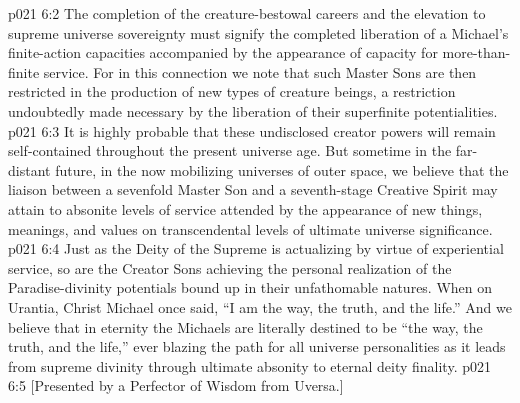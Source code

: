 \vs p021 6:2 The completion of the creature\hyp{}bestowal careers and the elevation to supreme universe sovereignty must signify the completed liberation of a Michael’s finite\hyp{}action capacities accompanied by the appearance of capacity for more\hyp{}than\hyp{}finite service. For in this connection we note that such Master Sons are then restricted in the production of new types of creature beings, a restriction undoubtedly made necessary by the liberation of their superfinite potentialities.
\vs p021 6:3 It is highly probable that these undisclosed creator powers will remain self\hyp{}contained throughout the present universe age. But sometime in the far\hyp{}distant future, in the now mobilizing universes of outer space, we believe that the liaison between a sevenfold Master Son and a seventh\hyp{}stage Creative Spirit may attain to absonite levels of service attended by the appearance of new things, meanings, and values on transcendental levels of ultimate universe significance.
\vs p021 6:4 Just as the Deity of the Supreme is actualizing by virtue of experiential service, so are the Creator Sons achieving the personal realization of the Paradise\hyp{}divinity potentials bound up in their unfathomable natures. When on Urantia, Christ Michael once said, \textcolor{ubdarkred}{“I am the way, the truth, and the life.”} And we believe that in eternity the Michaels are literally destined to be “the way, the truth, and the life,” ever blazing the path for all universe personalities as it leads from supreme divinity through ultimate absonity to eternal deity finality.
\vsetoff
\vs p021 6:5 [Presented by a Perfector of Wisdom from Uversa.]

